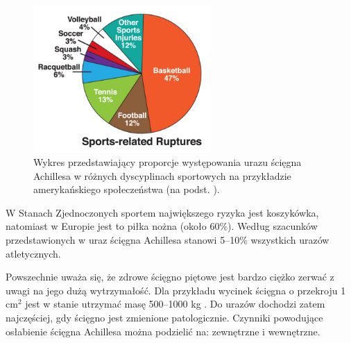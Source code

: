 \begin{figure}[h!]
	\centering
	\includegraphics[width=0.6\textwidth]{figures/Achilles_zerwanie.jpg}
	\caption{Wykres przedstawiający proporcje występowania urazu ścięgna Achillesa w różnych dyscyplinach sportowych na przykładzie amerykańskiego społeczeństwa (na podst. \cite{EpidemiologyUS}).}
	\label{rupture}
\end{figure}
W Stanach Zjednoczonych sportem największego ryzyka jest koszykówka, natomiast w Europie jest to piłka nożna (około 60\%). Według szacunków przedstawionych w \cite{CHIRALI2014211} uraz ścięgna Achillesa stanowi 5--10\% wszystkich urazów atletycznych.

Powszechnie uważa się, że zdrowe ścięgno piętowe jest bardzo ciężko zerwać z uwagi na jego dużą wytrzymałość. Dla przykładu wycinek ścięgna o przekroju 1 cm$^2$ jest w stanie utrzymać masę 500--1000 kg \cite{Maquirriain2011}. Do urazów dochodzi zatem najczęściej, gdy ścięgno jest zmienione patologicznie. Czynniki powodujące osłabienie ścięgna Achillesa można podzielić na: zewnętrzne i wewnętrzne.

